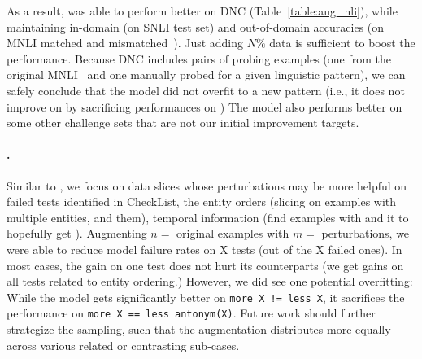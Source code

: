 As a result, \maug was able to perform better on DNC (Table~\ref{table:aug_nli}), while maintaining in-domain (on SNLI test set) and out-of-domain accuracies (on MNLI matched and mismatched~\cite{}).
Just adding $N\%$ data is sufficient to boost the performance.%
Because DNC includes pairs of probing examples (one from the original MNLI~\cite{} and one manually probed for a given linguistic pattern), we can safely conclude that the model did not overfit to a new pattern (i.e., it does not improve on  by sacrificing performances on )
The model also performs better on some other challenge sets that are not our initial improvement targets.


\paragraph{\qqp.}
Similar to \nli, we focus on data slices whose perturbations may be more helpful on failed tests identified in CheckList, \eg the entity orders (slicing on examples with multiple entities, and  them), temporal information (\eg find examples with  and \BLANK it to hopefully get ).
Augmenting $n=$ original examples with $m=$ perturbations, we were able to reduce model failure rates on X tests (out of the X failed ones). 
In most cases, the gain on one test does not hurt its counterparts (\eg we get gains on all tests related to entity ordering.)
However, we did see one potential overfitting: While the model gets significantly better on  \texttt{more X != less X}, it sacrifices the performance on \texttt{more X == less antonym(X)}.
Future work should further strategize the sampling, such that the augmentation distributes more equally across various related or contrasting sub-cases. 

